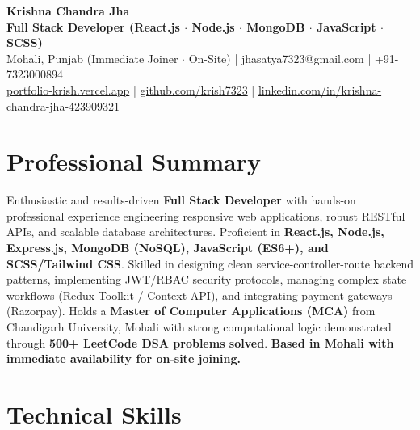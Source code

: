 \documentclass[a4paper,10pt]{article}
\begin{document}
\begin{center}

    {\LARGE \textbf{Krishna Chandra Jha}} \\[2.5pt]

    \textbf{Full Stack Developer (React.js $\cdot$ Node.js $\cdot$ MongoDB $\cdot$ JavaScript $\cdot$ SCSS)} \\[3.5pt]

    Mohali, Punjab (Immediate Joiner $\cdot$ On-Site)
    \quad | \quad
    jhasatya7323@gmail.com
    \quad | \quad
    +91-7323000894
    \\[2.5pt]

    \href{https://portfolio-ashen-alpha-dv0whhsamo.vercel.app/}{portfolio-krish.vercel.app}
    \quad | \quad
    \href{https://github.com/krish7323}{github.com/krish7323}
    \quad | \quad
    \href{https://linkedin.com/in/krishna-chandra-jha-423909321}
    {linkedin.com/in/krishna-chandra-jha-423909321}

\end{center}

\section*{Professional Summary}

Enthusiastic and results-driven \textbf{Full Stack Developer} with hands-on professional experience engineering responsive web applications, robust RESTful APIs, and scalable database architectures. Proficient in \textbf{React.js, Node.js, Express.js, MongoDB (NoSQL), JavaScript (ES6+), and SCSS/Tailwind CSS}. Skilled in designing clean service-controller-route backend patterns, implementing JWT/RBAC security protocols, managing complex state workflows (Redux Toolkit / Context API), and integrating payment gateways (Razorpay). Holds a \textbf{Master of Computer Applications (MCA)} from Chandigarh University, Mohali with strong computational logic demonstrated through \textbf{500+ LeetCode DSA problems solved}. \textbf{Based in Mohali with immediate availability for on-site joining.}

\section*{Technical Skills}
\end{document}
